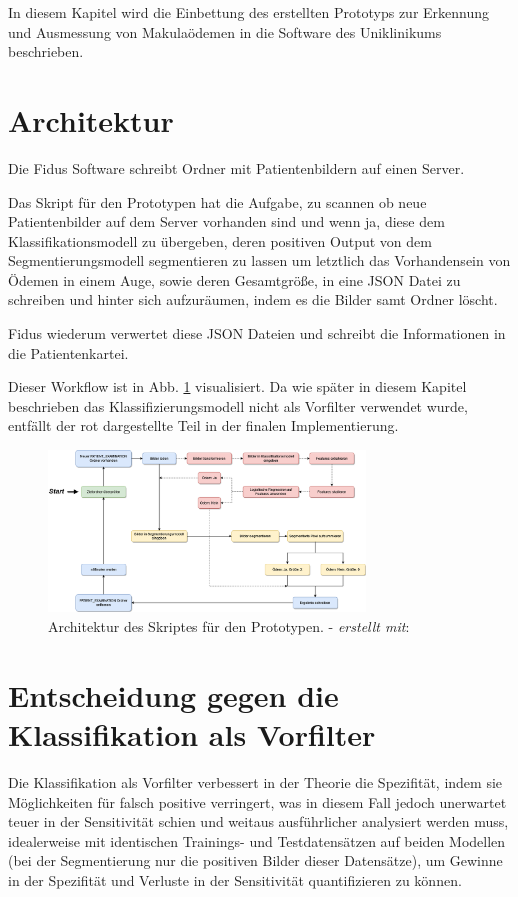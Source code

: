 In diesem Kapitel wird die Einbettung des erstellten Prototyps zur Erkennung und Ausmessung von Makulaödemen in die Software des Uniklinikums beschrieben.
\section{Architektur}

Die Fidus Software schreibt Ordner mit Patientenbildern auf einen Server.

Das Skript für den Prototypen hat die Aufgabe, zu scannen ob neue Patientenbilder auf dem Server vorhanden sind und wenn ja, diese dem Klassifikationsmodell zu übergeben, deren positiven Output von dem Segmentierungsmodell segmentieren zu lassen um letztlich das Vorhandensein von Ödemen in einem Auge, sowie deren Gesamtgröße, in eine JSON Datei zu schreiben und hinter sich aufzuräumen, indem es die Bilder samt Ordner löscht.

Fidus wiederum verwertet diese JSON Dateien und schreibt die Informationen in die Patientenkartei.

Dieser Workflow ist in Abb. \ref{fig:prototyp} visualisiert. Da wie später in diesem Kapitel beschrieben das Klassifizierungsmodell nicht als Vorfilter verwendet wurde, entfällt der rot dargestellte Teil in der finalen Implementierung.

\begin{figure}[ht!]
\centering
\includegraphics[width=0.75\textwidth]{./pic/Prototyp/flowchart.png} 
\caption{\label{fig:prototyp}Architektur des Skriptes für den Prototypen. - \textit{erstellt mit}: \cite{23}}
\end{figure}

\section{Entscheidung gegen die Klassifikation als Vorfilter}

Die Klassifikation als Vorfilter verbessert in der Theorie die Spezifität, indem sie Möglichkeiten für falsch positive verringert, was in diesem Fall jedoch unerwartet teuer in der Sensitivität schien und weitaus ausführlicher analysiert werden muss, idealerweise mit identischen Trainings- und Testdatensätzen auf beiden Modellen (bei der Segmentierung nur die positiven Bilder dieser Datensätze), um Gewinne in der Spezifität und Verluste in der Sensitivität quantifizieren zu können.

